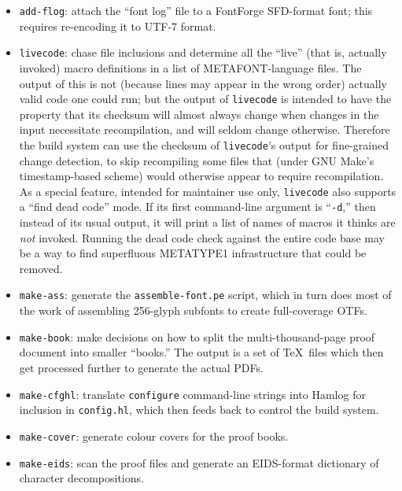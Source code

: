 \documentclass[14pt]{extarticle}
\begin{document}
\begin{itemize}

\item \texttt{add-flog}: attach the ``font log'' file to a FontForge
SFD-format font; this requires re-encoding it to UTF-7 format.

\item \texttt{livecode}: chase file inclusions and determine all the
``live'' (that is, actually invoked) macro definitions in a list of
METAFONT-language files.  The output of this is not (because lines may
appear in the wrong order) actually valid code one could run; but the output
of \texttt{livecode} is intended to have the property that its checksum will
almost always change when changes in the input necessitate recompilation,
and will seldom change otherwise.  Therefore the build system can use the
checksum of \texttt{livecode}'s output for fine-grained change detection, to
skip recompiling some files that (under GNU Make's timestamp-based scheme)
would otherwise appear to require recompilation.  As a special feature,
intended for maintainer use only, \texttt{livecode} also supports a ``find
dead code'' mode.  If its first command-line argument is ``\texttt{-d},''
then instead of its usual output, it will print a list of names of macros it
thinks are \emph{not} invoked.  Running the dead code check against the
entire code base may be a way to find superfluous METATYPE1 infrastructure
that could be removed.

\item \texttt{make-ass}: generate the \texttt{assemble-font.pe} script,
which in turn does most of the work of assembling 256-glyph subfonts to
create full-coverage OTFs.

\item \texttt{make-book}: make decisions on how to split the
multi-thousand-page proof document into smaller ``books.''  The output
is a set of \TeX\ files which then get processed further to generate the
actual PDFs.

\item \texttt{make-cfghl}: translate \texttt{configure} command-line strings
into Hamlog for inclusion in \texttt{config.hl}, which then feeds back to
control the build system.

\item \texttt{make-cover}: generate colour covers for the proof books.

\item \texttt{make-eids}: scan the proof files
and generate an EIDS-format dictionary of character decompositions.


\end{itemize}
\end{document}
